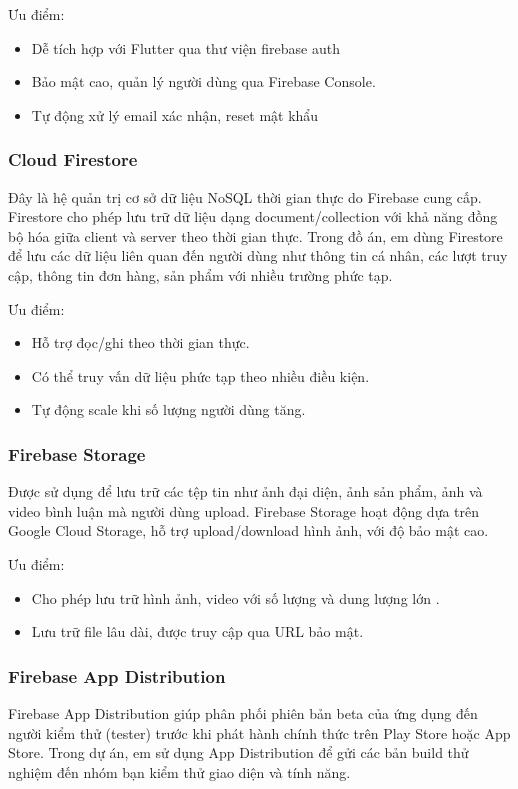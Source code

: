 \documentclass[../DoAn.tex]{subfiles}
\begin{document}
Ưu điểm:
\begin{itemize}
\item  Dễ tích hợp với Flutter qua thư viện firebase auth
\item Bảo mật cao, quản lý người dùng qua Firebase Console.
\item Tự động xử lý email xác nhận, reset mật khẩu
\end{itemize}

\subsubsection{Cloud Firestore}
Đây là hệ quản trị cơ sở dữ liệu NoSQL thời gian thực do Firebase cung cấp. Firestore cho phép lưu trữ dữ liệu dạng document/collection với khả năng đồng bộ hóa giữa client và server theo thời gian thực. Trong đồ án, em dùng Firestore để lưu các dữ liệu liên quan đến người dùng như thông tin cá nhân, các lượt truy cập, thông tin đơn hàng, sản phẩm với nhiều trường phức tạp.

Ưu điểm:
\begin{itemize}
\item Hỗ trợ đọc/ghi theo thời gian thực.
\item Có thể truy vấn dữ liệu phức tạp theo nhiều điều kiện.
\item Tự động scale khi số lượng người dùng tăng.
\end{itemize}

\subsubsection{Firebase Storage}
Được sử dụng để lưu trữ các tệp tin như ảnh đại diện, ảnh sản phẩm, ảnh và video bình luận mà người dùng upload. Firebase Storage hoạt động dựa trên Google Cloud Storage, hỗ trợ upload/download hình ảnh,  với độ bảo mật cao.

Ưu điểm:
\begin{itemize}
\item Cho phép lưu trữ hình ảnh, video với số lượng và dung lượng lớn .
\item Lưu trữ file lâu dài, được truy cập qua URL bảo mật.
\end{itemize}

\subsubsection{Firebase App Distribution}
Firebase App Distribution giúp phân phối phiên bản beta của ứng dụng đến người kiểm thử (tester) trước khi phát hành chính thức trên Play Store hoặc App Store. Trong dự án, em sử dụng App Distribution để gửi các bản build thử nghiệm đến nhóm bạn kiểm thử giao diện và tính năng.
\end{document}
